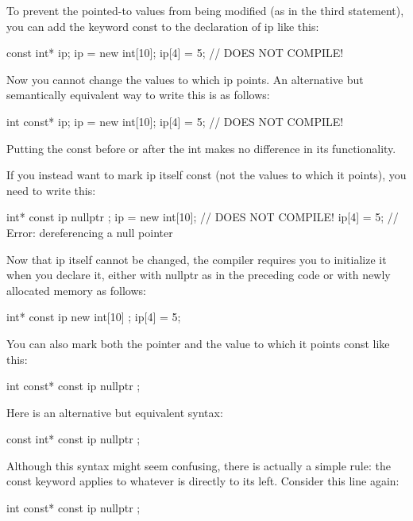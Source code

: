 To prevent the pointed-to values from being modified (as in the third statement), you can add the keyword const to the declaration of ip like this:

\begin{cpp}
const int* ip;
ip = new int[10];
ip[4] = 5; // DOES NOT COMPILE!
\end{cpp}

Now you cannot change the values to which ip points. An alternative but semantically equivalent way to write this is as follows:

\begin{cpp}
int const* ip;
ip = new int[10];
ip[4] = 5; // DOES NOT COMPILE!
\end{cpp}

Putting the const before or after the int makes no difference in its functionality.

If you instead want to mark ip itself const (not the values to which it points), you need to write this:

\begin{cpp}
int* const ip { nullptr };
ip = new int[10]; // DOES NOT COMPILE!
ip[4] = 5; // Error: dereferencing a null pointer
\end{cpp}

Now that ip itself cannot be changed, the compiler requires you to initialize it when you declare it, either with nullptr as in the preceding code or with newly allocated memory as follows:

\begin{cpp}
int* const ip { new int[10] };
ip[4] = 5;
\end{cpp}

You can also mark both the pointer and the value to which it points const like this:

\begin{cpp}
int const* const ip { nullptr };
\end{cpp}

Here is an alternative but equivalent syntax:

\begin{cpp}
const int* const ip { nullptr };
\end{cpp}

Although this syntax might seem confusing, there is actually a simple rule: the const keyword applies to whatever is directly to its left. Consider this line again:

\begin{cpp}
int const* const ip { nullptr };
\end{cpp}

